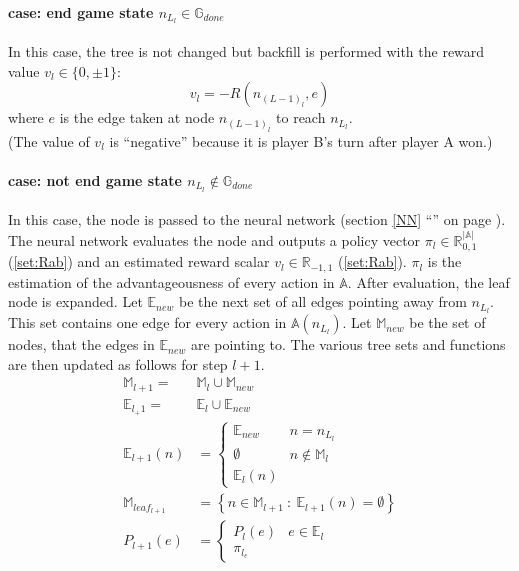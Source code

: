 \documentclass[12pt]{article}
\newcommand{\sectionref}[1]{section \ref{#1} ``\nameref{#1}'' on page \pageref{#1}}
\newcommand{\quckeq}[1]{(\ref{#1})}
\begin{document}
\paragraph*{case: end game state \(n_{L_l} \in \mathbb G_{done}\)}
In this case, the tree is not changed but backfill is performed with the reward value \(v_l \in \{0, \pm 1\}\):
\begin{equation}
v_l = -R(n_{(L-1)_l}, e)
\end{equation}
where \(e\) is the edge taken at node \(n_{(L-1)_l}\) to reach \(n_{L_l}\). \\
(The value of \(v_l\) is ``negative'' because it is player B's turn after player A won.)

\paragraph*{case: not end game state \(n_{L_l} \not\in \mathbb G_{done}\)}
In this case, the node is passed to the neural network (\sectionref{NN}). The neural network evaluates the node and outputs a policy vector \(\pi_l \in \mathbb R_{0,1}^{|\mathbb A|}\) \quckeq{set:Rab} and an estimated reward scalar \(v_l \in \mathbb R_{-1,1}\) \quckeq{set:Rab}. \(\pi_l\) is the estimation of the advantageousness of every action in \(\mathbb A\). After evaluation, the leaf node is expanded.
Let \(\mathbb E_{new}\) be the next set of all edges pointing away from \(n_{L_l}\). This set contains one edge for every action in \(\mathbb A(n_{L_l})\).
Let \(\mathbb M_{new}\) be the set of nodes, that the edges in \(\mathbb E_{new}\) are pointing to.
The various tree sets and functions are then updated as follows for step \(l+1\).
\begin{align}
\mathbb M_{l+1}   =& \mathbb M_l \cup \mathbb M_{new} \\
\mathbb E_{l_+1}  =& \mathbb E_l  \cup \mathbb E_{new} \\
%
\mathbb E_{l+1}(n) &= 
\left\{
\begin{matrix}
\mathbb E_{new} & n = n_{L_l}\\
\emptyset & n \not\in\mathbb M_l\\
\mathbb E_l(n)
\end{matrix}
\right.\\
%
\mathbb M_{leaf_{l+1}} &= \left\{n\in\mathbb M_{l+1}~:~\mathbb E_{l+1}(n) = \emptyset\right\}\\
%
P_{l+1}(e) &= 
\left\{
\begin{matrix}
P_l (e) & e \in\mathbb E_l\\
\pi_{l_e}&
\end{matrix}
\right.
\end{align}
\end{document}
